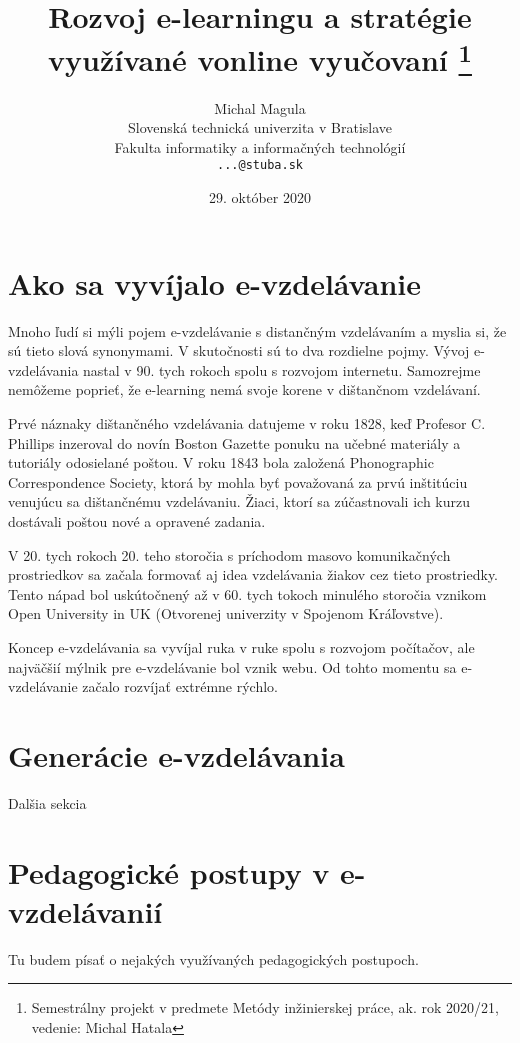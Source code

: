 \documentclass[10pt,twoside,slovak,a4paper]{article}
\title
{
	Rozvoj e-learningu a stratégie využívané vonline vyučovaní
	\thanks
	{
		Semestrálny projekt v predmete Metódy inžinierskej práce, ak. rok 2020/21, vedenie: Michal Hatala
	}
} %
\author{Michal Magula\\[2pt]
	{\small Slovenská technická univerzita v Bratislave}\\
	{\small Fakulta informatiky a informačných technológií}\\
	{\small \texttt{...@stuba.sk}}
	}
\date{\small 29. október 2020}
\begin{document}
\maketitle

\section{Ako sa vyvíjalo e-vzdelávanie} \label{Evolution}

	Mnoho ľudí si mýli pojem e-vzdelávanie s distančným vzdelávaním a myslia si, že sú tieto slová synonymami.
	V skutočnosti sú to dva rozdielne pojmy. Vývoj e-vzdelávania nastal v 90. tych rokoch spolu s rozvojom internetu.
	Samozrejme nemôžeme poprieť, že e-learning nemá svoje korene v dištančnom vzdelávaní.

	Prvé náznaky dištančného vzdelávania datujeme v roku 1828, keď Profesor C. Phillips inzeroval do novín
	Boston Gazette ponuku na učebné materiály a tutoriály odosielané poštou. V roku 1843 bola 
	založená Phonographic Correspondence Society, ktorá by mohla byť považovaná za prvú inštitúciu 
	venujúcu sa dištančnému vzdelávaniu. Žiaci, ktorí sa zúčastnovali ich kurzu dostávali poštou
	nové a opravené zadania.

	V 20. tych rokoch 20. teho storočia s príchodom masovo komunikačných prostriedkov sa začala formovať aj idea
	vzdelávania žiakov cez tieto prostriedky. Tento nápad bol uskútočnený až v 60. tych tokoch minulého storočia 
	vznikom Open University in UK (Otvorenej univerzity v Spojenom Kráľovstve).

	Koncep e-vzdelávania sa vyvíjal ruka v ruke spolu s rozvojom počítačov, ale 
	najväčšií mýlnik pre e-vzdelávanie bol vznik webu. Od tohto momentu sa 
	e-vzdelávanie začalo rozvíjať extrémne rýchlo.



\section{Generácie e-vzdelávania} \label{Generations}

Dalšia sekcia



\section{Pedagogické postupy v e-vzdelávanií} \label{pedagogicalApproaches}

Tu budem písať o nejakých využívaných pedagogických postupoch.
\end{document}
